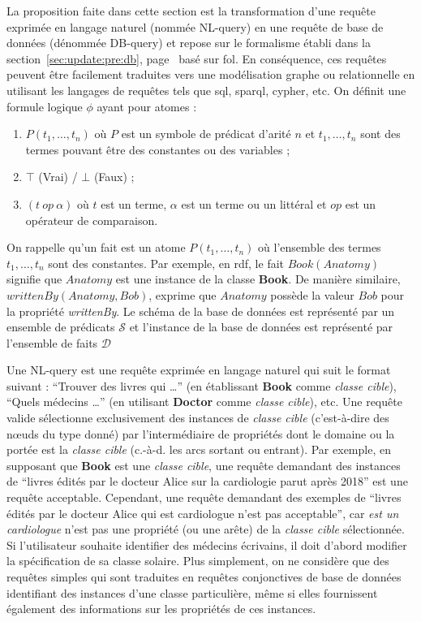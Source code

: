 La proposition faite dans cette section est la transformation d'une requête exprimée en langage naturel (nommée NL-query) en une requête de base de données (dénommée DB-query) et repose sur le formalisme établi dans la section~\ref{sec:update:pre:db}, page~\pageref{sec:update:pre:db} basé sur \gls{fol}.
En conséquence, ces requêtes peuvent être facilement traduites vers une modélisation graphe ou relationnelle en utilisant les langages de requêtes tels que \gls{sql}, \gls{sparql}, \gls{cypher}, etc.
On définit une formule logique $\phi$ ayant pour atomes :
\begin{enumerate}
    \item $P(t_1, \dots, t_n)$ où $P$ est un symbole de prédicat d'arité $n$ et $t_1, \dots, t_n$ sont des termes pouvant être des constantes ou des variables ;
    \item $\top$ (Vrai) / $\bot$ (Faux) ;
    \item $(t\ op\ \alpha)$ où $t$ est un terme, $\alpha$ est un terme ou un littéral et $op$ est un opérateur de comparaison.
\end{enumerate}
On rappelle qu'un fait est un atome $P(t_1, \dots, t_n)$ où l'ensemble des termes $t_1, \dots, t_n$ sont des constantes.
Par exemple, en \gls{rdf}, le fait $Book(Anatomy)$ signifie que $Anatomy$ est une instance de la classe \textbf{Book}.
De manière similaire, $writtenBy(Anatomy, Bob)$, exprime que $Anatomy$ possède la valeur $Bob$ pour la propriété \textit{writtenBy}.
Le schéma de la base de données est représenté par un ensemble de prédicats $\mathcal{S}$ et l'instance de la base de données est représenté par l'ensemble de faits $\mathcal{D}$

\begin{definition}[NL-query]
    Une NL-query est une requête exprimée en langage naturel qui suit le format suivant : \enquote{Trouver des livres qui \dots} (en établissant \textbf{Book} comme \emph{classe cible}), \enquote{Quels médecins \dots} (en utilisant \textbf{Doctor} comme \emph{classe cible}), etc.
    Une requête valide sélectionne exclusivement des instances de  \emph{classe cible} (c'est-à-dire des nœuds du type donné) par l'intermédiaire de propriétés dont le domaine ou la portée est la \emph{classe cible} (c.-à-d. les arcs sortant ou entrant).
    Par exemple, en supposant que \textbf{Book} est une \emph{classe cible}, une requête demandant des instances de \enquote{livres édités par le docteur Alice sur la cardiologie parut après 2018} est une requête acceptable.
    Cependant, une requête demandant des exemples de \enquote{livres édités par le docteur Alice qui est cardiologue n'est pas acceptable}, car \emph{est un cardiologue} n'est pas une propriété (ou une arête) de la \emph{classe cible} sélectionnée.
    Si l'utilisateur souhaite identifier des médecins écrivains, il doit d'abord modifier la spécification de sa classe solaire.
    Plus simplement, on ne considère que des requêtes simples qui sont traduites en requêtes conjonctives de base de données identifiant des instances d'une classe particulière, même si elles fournissent également des informations sur les propriétés de ces instances.
\end{definition}

